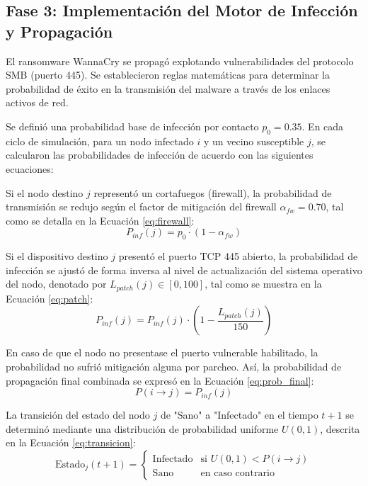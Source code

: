 \subsection{Fase 3: Implementación del Motor de Infección y Propagación}
El ransomware WannaCry se propagó explotando vulnerabilidades del protocolo SMB (puerto 445). Se establecieron reglas matemáticas para determinar la probabilidad de éxito en la transmisión del malware a través de los enlaces activos de red.

Se definió una probabilidad base de infección por contacto $p_0 = 0.35$. En cada ciclo de simulación, para un nodo infectado $i$ y un vecino susceptible $j$, se calcularon las probabilidades de infección de acuerdo con las siguientes ecuaciones:

Si el nodo destino $j$ representó un cortafuegos (firewall), la probabilidad de transmisión se redujo según el factor de mitigación del firewall $\alpha_{fw} = 0.70$, tal como se detalla en la Ecuación \ref{eq:firewall}:
\begin{equation}\label{eq:firewall}
P_{inf}(j) = p_0 \cdot (1 - \alpha_{fw})
\end{equation}

Si el dispositivo destino $j$ presentó el puerto TCP 445 abierto, la probabilidad de infección se ajustó de forma inversa al nivel de actualización del sistema operativo del nodo, denotado por $L_{patch}(j) \in [0, 100]$, tal como se muestra en la Ecuación \ref{eq:patch}:
\begin{equation}\label{eq:patch}
P_{inf}(j) = P_{inf}(j) \cdot \left(1 - \frac{L_{patch}(j)}{150}\right)
\end{equation}

En caso de que el nodo no presentase el puerto vulnerable habilitado, la probabilidad no sufrió mitigación alguna por parcheo. Así, la probabilidad de propagación final combinada se expresó en la Ecuación \ref{eq:prob_final}:
\begin{equation}\label{eq:prob_final}
P(i \to j) = P_{inf}(j)
\end{equation}

La transición del estado del nodo $j$ de "Sano" a "Infectado" en el tiempo $t+1$ se determinó mediante una distribución de probabilidad uniforme $U(0,1)$, descrita en la Ecuación \ref{eq:transicion}:
\begin{equation}\label{eq:transicion}
\text{Estado}_j(t+1) = \begin{cases} \text{Infectado} & \text{si } U(0,1) < P(i \to j) \\ \text{Sano} & \text{en caso contrario} \end{cases}
\end{equation}

